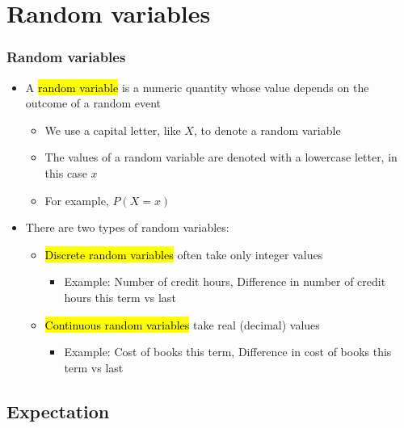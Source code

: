 \section{Random variables}


\begin{frame}
\frametitle{Random variables}

\begin{itemize}

\item A \hl{random variable} is a numeric quantity whose value depends on the outcome of a random event
\begin{itemize}
\item We use a capital letter, like $X$, to denote a random variable
\item The values of a random variable are denoted with a lowercase letter, in this case $x$
\item For example, $P(X = x)$
\end{itemize}

\item There are two types of random variables:
\begin{itemize}
\item \hl{Discrete random variables} often take only integer values
\begin{itemize}
\item Example: Number of credit hours, Difference in number of credit hours this term vs last
\end{itemize}
\item \hl{Continuous random variables} take real (decimal) values
\begin{itemize}
\item Example: Cost of books this term, Difference in cost of books this term vs last
\end{itemize}
\end{itemize}

\end{itemize}

\end{frame}


\subsection{Expectation}


